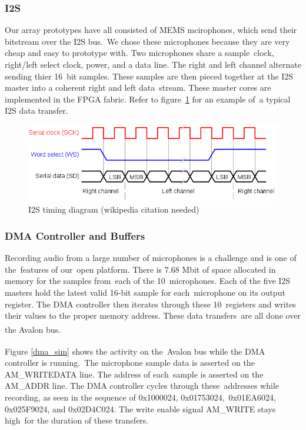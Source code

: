 \documentclass{article}
\begin{document}
\subsubsection{I2S}
Our array prototypes have all consisted of MEMS mcirophones, which send their bitstream over the I2S bus.\
We chose these microphones because they are very cheap and easy to prototype with. Two microphones share a sample\
clock, right/left select clock, power, and a data line. The right and left channel alternate sending thier 16\
bit samples. These samples are then pieced together at the I2S master into a coherent right and left data\
stream. These master cores are implemented in the FPGA fabric. Refer to figure\
\ref{i2s_timing} for an example of\
a typical I2S data transfer.

\begin{figure}[ht]
	\includegraphics[scale=.5]{pictures/i2s_timing.png}
	\centering
	\caption{I2S timing diagram (wikipedia citation needed)}
	\label{i2s_timing}
\end{figure}

\newpage

\subsubsection{DMA Controller and Buffers}
Recording audio from a large number of microphones is a challenge and is one of the\
features of our\
open platform. There is 7.68 Mbit of space allocated in memory for the samples from\
each of the 10\
microphones. Each of the five I2S masters hold the latest valid 16-bit sample for each\
microphone on its output register. The DMA controller then iterates through these 10\
registers and writes their values to the proper memory address.  These data transfers\
are all done over the Avalon\textsuperscript{\textregistered{}} bus. \

Figure \ref{dma_sim} shows the activity on the\
Avalon\textsuperscript{\textregistered{}} bus while the DMA controller is running.\
The microphone sample data is asserted on the AM\_WRITEDATA line.  The address of each\
sample is asserted on the AM\_ADDR line.  The DMA controller cycles through these\
addresses while recording, as seen in the sequence of 0x1000024, 0x01753024,\
0x01EA6024, 0x025F9024, and 0x02D4C024. The write enable signal AM\_WRITE stays high\
for the duration of these transfers.
\end{document}
